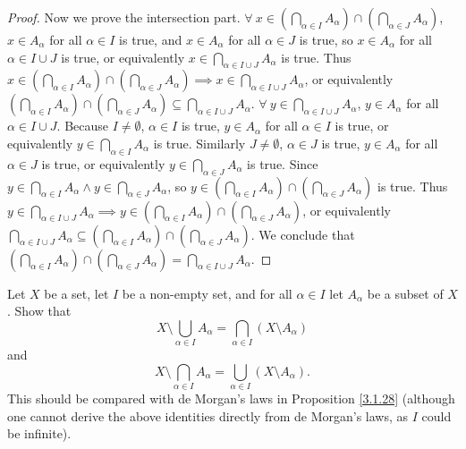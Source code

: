 \begin{proof}
Now we prove the intersection part.
\(\forall\ x \in (\bigcap_{\alpha \in I} A_{\alpha}) \cap (\bigcap_{\alpha \in J} A_{\alpha})\), \(x \in A_{\alpha}\) for all \(\alpha \in I\) is true, and \(x \in A_{\alpha}\) for all \(\alpha \in J\) is true, so \(x \in A_{\alpha}\) for all \(\alpha \in I \cup J\) is true, or equivalently \(x \in \bigcap_{\alpha \in I \cup J} A_{\alpha}\) is true.
Thus \(x \in (\bigcap_{\alpha \in I} A_{\alpha}) \cap (\bigcap_{\alpha \in J} A_{\alpha}) \implies x \in \bigcap_{\alpha \in I \cup J} A_{\alpha}\), or equivalently \((\bigcap_{\alpha \in I} A_{\alpha}) \cap (\bigcap_{\alpha \in J} A_{\alpha}) \subseteq \bigcap_{\alpha \in I \cup J} A_{\alpha}\).
\(\forall\ y \in \bigcap_{\alpha \in I \cup J} A_{\alpha}\), \(y \in A_{\alpha}\) for all \(\alpha \in I \cup J\).
Because \(I \neq \emptyset\), \(\alpha \in I\) is true, \(y \in A_{\alpha}\) for all \(\alpha \in I\) is true, or equivalently \(y \in \bigcap_{\alpha \in I} A_{\alpha}\) is true.
Similarly \(J \neq \emptyset\), \(\alpha \in J\) is true, \(y \in A_{\alpha}\) for all \(\alpha \in J\) is true, or equivalently \(y \in \bigcap_{\alpha \in J} A_{\alpha}\) is true.
Since \(y \in \bigcap_{\alpha \in I} A_{\alpha} \land y \in \bigcap_{\alpha \in J} A_{\alpha}\), so \(y \in (\bigcap_{\alpha \in I} A_{\alpha}) \cap (\bigcap_{\alpha \in J} A_{\alpha})\) is true.
Thus \(y \in \bigcap_{\alpha \in I \cup J} A_{\alpha} \implies y \in (\bigcap_{\alpha \in I} A_{\alpha}) \cap (\bigcap_{\alpha \in J} A_{\alpha})\), or equivalently \(\bigcap_{\alpha \in I \cup J} A_{\alpha} \subseteq (\bigcap_{\alpha \in I} A_{\alpha}) \cap (\bigcap_{\alpha \in J} A_{\alpha})\).
We conclude that \((\bigcap_{\alpha \in I} A_{\alpha}) \cap (\bigcap_{\alpha \in J} A_{\alpha}) = \bigcap_{\alpha \in I \cup J} A_{\alpha}\).
\end{proof}

\begin{exercise}\label{ex 3.4.11}
Let \(X\) be a set, let \(I\) be a non-empty set, and for all \(\alpha \in I\) let \(A_{\alpha}\) be a subset of \(X\).
Show that
\[
    X \setminus \bigcup_{\alpha \in I} A_{\alpha} = \bigcap_{\alpha \in I} (X \setminus A_{\alpha})
\]
and
\[
    X \setminus \bigcap_{\alpha \in I} A_{\alpha} = \bigcup_{\alpha \in I} (X \setminus A_{\alpha}).
\]
This should be compared with de Morgan’s laws in Proposition \ref{3.1.28}
(although one cannot derive the above identities directly from de Morgan’s laws, as \(I\) could be infinite).
\end{exercise}

